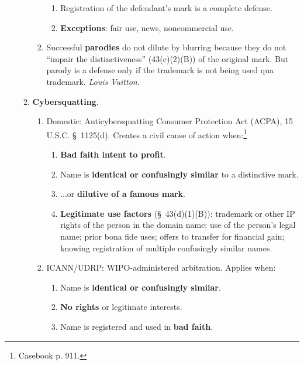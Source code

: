 \begin{enumerate}
\begin{enumerate}
\begin{enumerate}
\begin{enumerate}
                \item Registration of the defendant's mark is a complete 
                defense.
                \item \textbf{Exceptions}: fair use, news, noncommercial use.  
                \end{enumerate}
            \item Successful \textbf{parodies} do not dilute by blurring 
            because they do not ``impair the distinctiveness'' (43(c)(2)(B)) 
            of the original mark. But parody is a defense only if the 
            trademark is not being used qua trademark. \emph{Louis Vuitton}.
        \end{enumerate}
        \item \textbf{Cybersquatting}.
            \begin{enumerate}
                \item Domestic: Anticybersquatting Consumer Protection Act 
                (ACPA), 15 U.S.C. \S\ 1125(d). Creates a civil cause of action 
                when:\footnote{Casebook p. 911.}
                \begin{enumerate}
                    \item \textbf{Bad faith intent to profit}.
                    \item Name is \textbf{identical or confusingly similar} to 
                    a distinctive mark.
                    \item ...or \textbf{dilutive of a famous mark}.
                    \item \textbf{Legitimate use factors} (\S\ 43(d)(1)(B)): 
                    trademark or other IP rights of the person in the domain 
                    name; use of the person's legal name; prior bona fide 
                    uses; offers to transfer for financial gain; knowing 
                    registration of multiple confusingly similar names.
                \end{enumerate}
                \item ICANN/UDRP: WIPO-administered arbitration. Applies when:
                \begin{enumerate}
                    \item Name is \textbf{identical or confusingly similar}.
                    \item \textbf{No rights} or legitimate interests.
                    \item Name is registered and used in \textbf{bad faith}.

\end{enumerate}
\end{enumerate}
\end{enumerate}
\end{enumerate}
